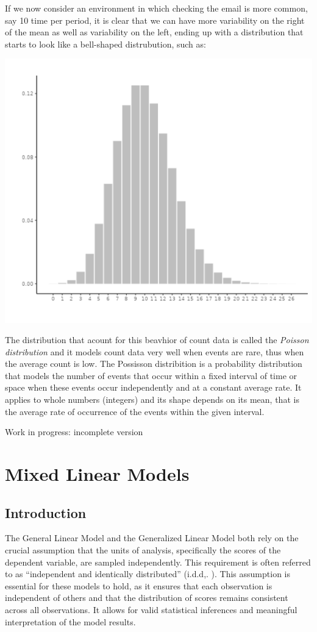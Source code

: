 \documentclass[
]{book}
\begin{document}
If we now consider an environment in which checking the email is more common, say 10 time per period, it is clear that we can have more variability on the right of the mean as well as variability on the left, ending up with a distribution that starts to look like a bell-shaped distrubution, such as:

\includegraphics[width=0.6\linewidth]{bookletpics/3_poisson_theory3}

The distribution that acount for this beavhior of count data is called the \emph{Poisson distribution} and it models count data very well when events are rare, thus when the average count is low. The Possisson distribition is a probability distribution that models the number of events that occur within a fixed interval of time or space when these events occur independently and at a constant average rate. It applies to whole numbers (integers) and its shape depends on its mean, that is the average rate of occurrence of the events within the given interval.

{ Work in progress: incomplete version }

\hypertarget{mixed}{%
\chapter{Mixed Linear Models}\label{mixed}}

\hypertarget{introduction-1}{%
\section{Introduction}\label{introduction-1}}

The General Linear Model and the Generalized Linear Model both rely on the crucial assumption that the units of analysis, specifically the scores of the dependent variable, are sampled independently. This requirement is often referred to as ``independent and identically distributed'' (i.d.d,.
). This assumption is essential for these models to hold, as it ensures that each observation is independent of others and that the distribution of scores remains consistent across all observations. It allows for valid statistical inferences and meaningful interpretation of the model results.
\end{document}
